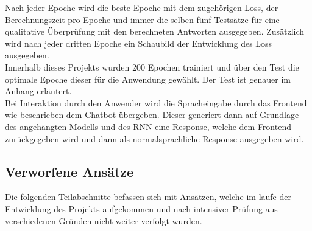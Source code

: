 \documentclass{aa}
\begin{document}
        Nach jeder Epoche wird die beste Epoche mit dem zugehörigen Loss, der Berechnungszeit pro Epoche und immer die selben fünf Testsätze für eine qualitative Überprüfung mit den berechneten Antworten ausgegeben. Zusätzlich wird nach jeder dritten Epoche ein Schaubild der Entwicklung des Loss ausgegeben.\\
        Innerhalb dieses Projekts wurden 200 Epochen trainiert und über den Test die optimale Epoche dieser für die Anwendung gewählt. Der Test ist genauer im Anhang erläutert.\\
        Bei Interaktion durch den Anwender wird die Spracheingabe durch das Frontend wie beschrieben dem Chatbot übergeben. Dieser generiert dann auf Grundlage des angehängten Modells und des RNN eine Response, welche dem Frontend zurückgegeben wird und dann als normalsprachliche Response ausgegeben wird.
        
    
    \subsection{Verworfene Ansätze}
        Die folgenden Teilabschnitte befassen sich mit Ansätzen, welche im laufe der Entwicklung des Projekts aufgekommen und nach intensiver Prüfung aus verschiedenen Gründen nicht weiter verfolgt wurden.
\end{document}
